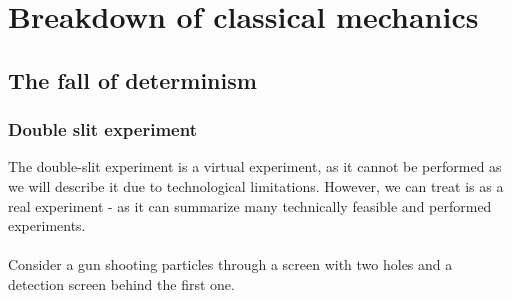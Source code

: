 \graphicspath{{chapters/02/}}
\chapter{Breakdown of classical mechanics}

\section{The fall of determinism}

  \subsection{Double slit experiment}
  The double-slit experiment is a virtual experiment, as it cannot be performed as we will describe it due to technological limitations. However, we can treat is as a real experiment - as it can summarize many technically feasible and performed experiments.\\
  \\
  \noindent
 Consider a gun shooting particles through a screen with two holes and a detection screen behind the first one.
 
